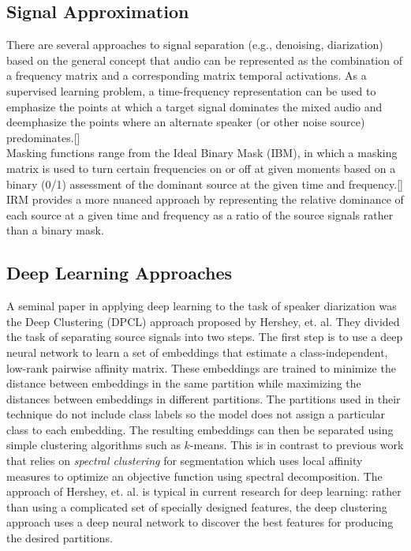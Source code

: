 \documentclass[journal, a4paper]{IEEEtran}
\begin{document}
\subsection{Signal Approximation}

There are several approaches to signal separation (e.g., denoising, diarization) based on the general concept that audio can be represented as the combination of a frequency matrix and a corresponding matrix temporal activations. As a supervised learning problem, a time-frequency  representation can be used to emphasize the points at which a target signal dominates the mixed audio and deemphasize the points where an alternate speaker (or other noise source) predominates.[\cite{}]\\

Masking functions range from the Ideal Binary Mask (IBM), in which a masking matrix is used to turn certain frequencies on or off at given moments based on a binary (0/1) assessment of the dominant source at the given time and frequency.[\cite{}] IRM provides a more nuanced approach by representing the relative dominance of each source at a given time and frequency as a ratio of the source signals rather than a binary mask.{\cite{}}



\subsection{Deep Learning Approaches}

A seminal paper in applying deep learning to the task of speaker diarization was the Deep Clustering (DPCL) \cite{DBLP:journals/corr/HersheyCRW15} approach proposed by Hershey, et. al. They divided the task of separating source signals into two steps. The first step is to use a deep neural network to learn a set of embeddings that estimate a class-independent, low-rank pairwise affinity matrix. These embeddings are trained to minimize the distance between embeddings in the same partition while maximizing the distances between embeddings in different partitions. The partitions used in their technique do not include class labels so the model does not assign a particular class to each embedding. The resulting embeddings can then be separated using simple clustering algorithms such as $k$-means. This is in contrast to previous work that relies on \textit{spectral clustering} for segmentation which uses local affinity measures to optimize an objective function using spectral decomposition. The approach of Hershey, et. al. is typical in current research for deep learning: rather than using a complicated set of specially designed features, the deep clustering approach uses a deep neural network to discover the best features for producing the desired partitions.
\end{document}
